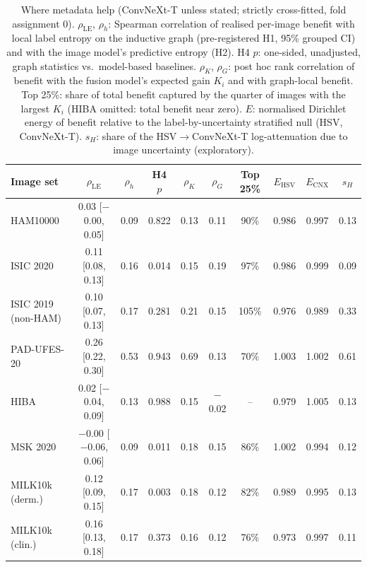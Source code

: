 \begin{table}[tp]\centering\footnotesize
\caption{Where metadata help (ConvNeXt-T unless stated; strictly cross-fitted, fold assignment 0). $\rho_{\mathrm{LE}}$, $\rho_{h}$: Spearman correlation of realised per-image benefit with local label entropy on the inductive graph (pre-registered H1, 95\% grouped CI) and with the image model's predictive entropy (H2). H4 $p$: one-sided, unadjusted, graph statistics vs.\ model-based baselines. $\rho_K$, $\rho_G$: post hoc rank correlation of benefit with the fusion model's expected gain $K_i$ and with graph-local benefit. Top 25\%: share of total benefit captured by the quarter of images with the largest $K_i$ (HIBA omitted: total benefit near zero). $E$: normalised Dirichlet energy of benefit relative to the label-by-uncertainty stratified null (HSV, ConvNeXt-T). $s_H$: share of the HSV$\to$ConvNeXt-T log-attenuation due to image uncertainty (exploratory).}\label{tab:graph}
\setlength{\tabcolsep}{3pt}
\begin{tabular}{lccccccccc}\toprule
Image set & $\rho_{\mathrm{LE}}$ & $\rho_h$ & H4 $p$ & $\rho_K$ & $\rho_G$ & Top 25\% & $E_{\mathrm{HSV}}$ & $E_{\mathrm{CNX}}$ & $s_H$\\\midrule
HAM10000 & 0.03 [\ensuremath{-}0.00, 0.05] & 0.09 & 0.822 & 0.13 & 0.11 & 90\% & 0.986 & 0.997 & 0.13\\
ISIC 2020 & 0.11 [0.08, 0.13] & 0.16 & 0.014 & 0.15 & 0.19 & 97\% & 0.986 & 0.999 & 0.09\\
ISIC 2019 (non-HAM) & 0.10 [0.07, 0.13] & 0.17 & 0.281 & 0.21 & 0.15 & 105\% & 0.976 & 0.989 & 0.33\\
PAD-UFES-20 & 0.26 [0.22, 0.30] & 0.53 & 0.943 & 0.69 & 0.13 & 70\% & 1.003 & 1.002 & 0.61\\
HIBA & 0.02 [\ensuremath{-}0.04, 0.09] & 0.13 & 0.988 & 0.15 & \ensuremath{-}0.02 & -- & 0.979 & 1.005 & 0.13\\
MSK 2020 & \ensuremath{-}0.00 [\ensuremath{-}0.06, 0.06] & 0.09 & 0.011 & 0.18 & 0.15 & 86\% & 1.002 & 0.994 & 0.12\\
MILK10k (derm.) & 0.12 [0.09, 0.15] & 0.17 & 0.003 & 0.18 & 0.12 & 82\% & 0.989 & 0.995 & 0.13\\
MILK10k (clin.) & 0.16 [0.13, 0.18] & 0.17 & 0.373 & 0.16 & 0.12 & 76\% & 0.973 & 0.997 & 0.11\\
\bottomrule\end{tabular}\end{table}
